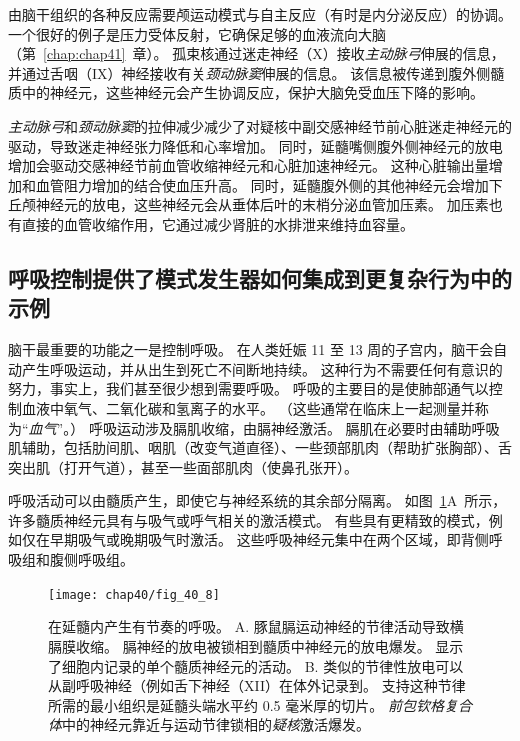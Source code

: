 由脑干组织的各种反应需要颅运动模式与自主反应（有时是内分泌反应）的协调。
一个很好的例子是压力受体反射，它确保足够的血液流向大脑（第~\ref{chap:chap41}~章）。
孤束核通过迷走神经（X）接收\textit{主动脉弓}伸展的信息，并通过舌咽（IX）神经接收有关\textit{颈动脉窦}伸展的信息。
该信息被传递到腹外侧髓质中的神经元，这些神经元会产生协调反应，保护大脑免受血压下降的影响。


\textit{主动脉弓}和\textit{颈动脉窦}的拉伸减少减少了对疑核中副交感神经节前心脏迷走神经元的驱动，导致迷走神经张力降低和心率增加。
同时，延髓嘴侧腹外侧神经元的放电增加会驱动交感神经节前血管收缩神经元和心脏加速神经元。
这种心脏输出量增加和血管阻力增加的结合使血压升高。
同时，延髓腹外侧的其他神经元会增加下丘颅神经元的放电，这些神经元会从垂体后叶的末梢分泌血管加压素。
加压素也有直接的血管收缩作用，它通过减少肾脏的水排泄来维持血容量。



\subsection{呼吸控制提供了模式发生器如何集成到更复杂行为中的示例}

脑干最重要的功能之一是控制呼吸。
在人类妊娠 11 至 13 周的子宫内，脑干会自动产生呼吸运动，并从出生到死亡不间断地持续。
这种行为不需要任何有意识的努力，事实上，我们甚至很少想到需要呼吸。
呼吸的主要目的是使肺部通气以控制血液中氧气、二氧化碳和氢离子的水平。
（这些通常在临床上一起测量并称为“\textit{血气}”。）
呼吸运动涉及膈肌收缩，由膈神经激活。
膈肌在必要时由辅助呼吸肌辅助，包括肋间肌、咽肌（改变气道直径）、一些颈部肌肉（帮助扩张胸部）、舌突出肌（打开气道），甚至一些面部肌肉（使鼻孔张开）。


呼吸活动可以由髓质产生，即使它与神经系统的其余部分隔离。
如图~\ref{fig:40_8}A~所示，许多髓质神经元具有与吸气或呼气相关的激活模式。
有些具有更精致的模式，例如仅在早期吸气或晚期吸气时激活。
这些呼吸神经元集中在两个区域，即背侧呼吸组和腹侧呼吸组。


\begin{figure}[htbp]
	\centering
	\texttt{[image: chap40/fig\_40\_8]}
	\caption{在延髓内产生有节奏的呼吸。 
		A. 豚鼠膈运动神经的节律活动导致横膈膜收缩。
		膈神经的放电被锁相到髓质中神经元的放电爆发。
		显示了细胞内记录的单个髓质神经元的活动\cite{richerson1987maintenance}。
		B. 类似的节律性放电可以从副呼吸神经（例如舌下神经（XII）在体外记录到。
		支持这种节律所需的最小组织是延髓头端水平约 0.5 毫米厚的切片。
		\textit{前包钦格复合体}中的神经元靠近与运动节律锁相的\textit{疑核}激活爆发\cite{smith1991pre}。}
	\label{fig:40_8}
\end{figure}


